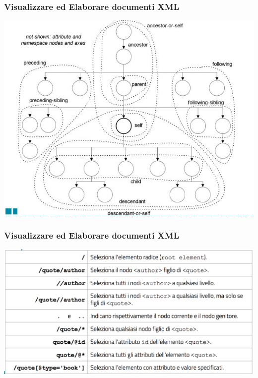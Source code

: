 \begin{frame}
    \frametitle{Visualizzare ed Elaborare documenti XML}
    \addtocounter{nframe}{1}
    
    \begin{center}
        \includegraphics[width=.9\textwidth]{imgs/SchemaAssi-Xpath.png}
    \end{center}

\end{frame}

\begin{frame}
    \frametitle{Visualizzare ed Elaborare documenti XML}
    \addtocounter{nframe}{1}
    
    \begin{center}
        \includegraphics[width=.9\textwidth]{imgs/Sintassi-Abbreviata.png}
    \end{center}

\end{frame}


